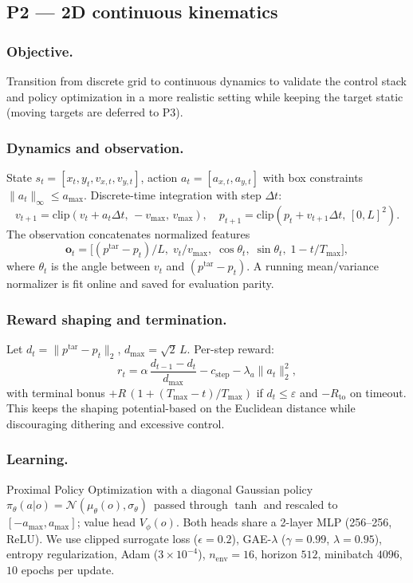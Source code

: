     \subsection{P2 — 2D continuous kinematics}

        \subsubsection{Objective.}
            Transition from discrete grid to continuous dynamics to validate the control stack and policy optimization in a more realistic setting while keeping the target static (moving targets are deferred to P3).

        \subsubsection{Dynamics and observation.}
            State $s_t=[x_t,y_t,v_{x,t},v_{y,t}]$, action $a_t=[a_{x,t},a_{y,t}]$ with box constraints $\|a_t\|_\infty\le a_{\max}$.
            Discrete-time integration with step $\Delta t$:
            \[
                v_{t+1}=\mathrm{clip}(v_t + a_t \Delta t,\,-v_{\max},\,v_{\max}),\quad
                p_{t+1}=\mathrm{clip}(p_t + v_{t+1}\Delta t,\, [0,L]^2).
            \]
            The observation concatenates normalized features
            \[
                \mathbf{o}_t=\big[(p^{\mathrm{tar}}{-}p_t)/L,\; v_t/v_{\max},\; \cos\theta_t,\; \sin\theta_t,\; 1{-}t/T_{\max}\big],
            \]
            where $\theta_t$ is the angle between $v_t$ and $(p^{\mathrm{tar}}{-}p_t)$. A running mean/variance normalizer is fit online and saved for evaluation parity.

        \subsubsection{Reward shaping and termination.}
            Let $d_t=\|p^{\mathrm{tar}}-p_t\|_2$, $d_{\max}=\sqrt{2}\,L$. Per-step reward:
            \[
                r_t=\alpha\,\frac{d_{t-1}-d_t}{d_{\max}}
                     - c_{\text{step}} - \lambda_a \|a_t\|_2^2,
            \]
            with terminal bonus $+R\,(1{+}(T_{\max}-t)/T_{\max})$ if $d_t\le \varepsilon$ and $-R_{\text{to}}$ on timeout. This keeps the shaping potential-based on the Euclidean distance while discouraging dithering and excessive control.

        \subsubsection{Learning.}
            Proximal Policy Optimization with a diagonal Gaussian policy $\pi_\theta(a|o)=\mathcal{N}(\mu_\theta(o),\sigma_\theta)\,$ passed through $\tanh$ and rescaled to $[-a_{\max},a_{\max}]$; value head $V_\phi(o)$. Both heads share a 2-layer MLP (256–256, ReLU). We use clipped surrogate loss ($\epsilon{=}0.2$), GAE-$\lambda$ ($\gamma{=}0.99$, $\lambda{=}0.95$), entropy regularization, Adam ($3\!\times\!10^{-4}$), $n_{\text{env}}{=}16$, horizon $512$, minibatch $4096$, $10$ epochs per update.

